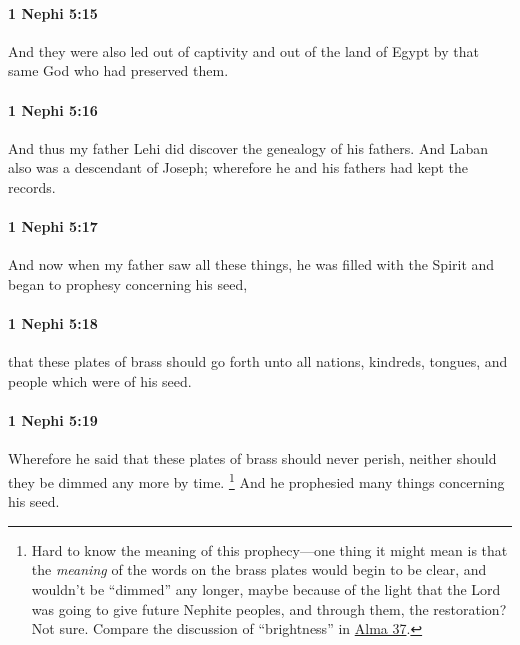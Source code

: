 		\paragraph{1 Nephi 5:15} %
			\label{1NEPHI-5-15}

			And they were also led out of captivity and out of the land of Egypt
			by that same God who had preserved them.

		\paragraph{1 Nephi 5:16} %
			\label{1NEPHI-5-16}

			And thus my father Lehi did discover the genealogy of his fathers.
			And Laban also was a descendant of Joseph;
			wherefore he and his fathers had kept the records.

		\paragraph{1 Nephi 5:17} %
			\label{1NEPHI-5-17}

			And now when my father saw all these things,
			he was filled with the Spirit and began to prophesy concerning his seed,

		\paragraph{1 Nephi 5:18} %
			\label{1NEPHI-5-18}

			that these plates of brass should go forth
			unto all nations, kindreds, tongues, and people which were of his seed.

		\paragraph{1 Nephi 5:19} %
			\label{1NEPHI-5-19}

			Wherefore he said that these plates of brass should never perish,
			neither should they be dimmed any more by time.%
				\footnote{%
					Hard to know the meaning of this prophecy---one thing it might mean is that the \textit{meaning} of the words on the brass plates would begin to be clear, and wouldn't be ``dimmed'' any longer, maybe because of the light that the Lord was going to give future Nephite peoples, and through them, the restoration? Not sure. Compare the discussion of ``brightness'' in \hyperref[ALMA-37]{Alma 37}.
					}
			And he prophesied many things concerning his seed.

